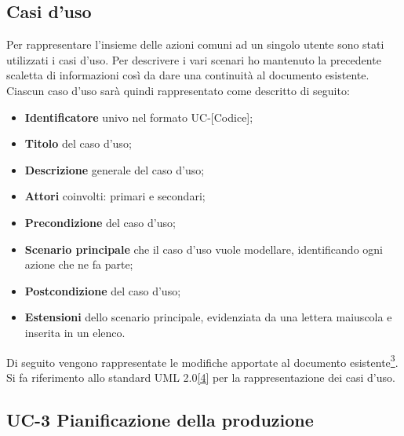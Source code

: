 
\subsection{Casi d'uso}

Per rappresentare l'insieme delle azioni comuni ad un singolo utente sono stati utilizzati i casi d'uso.
Per descrivere i vari scenari ho mantenuto la precedente scaletta di informazioni così da dare una continuità al documento esistente. 
Ciascun caso d'uso sarà quindi rappresentato come descritto di seguito:
\begin{itemize}
    \item \textbf{Identificatore} univo nel formato UC-[Codice];
    \item \textbf{Titolo} del caso d'uso;
    \item \textbf{Descrizione} generale del caso d'uso;
    \item \textbf{Attori} coinvolti: primari e secondari;
    \item \textbf{Precondizione} del caso d'uso;
    \item \textbf{Scenario principale} che il caso d'uso vuole modellare, identificando ogni azione che ne fa parte;
    \item \textbf{Postcondizione} del caso d'uso;
    \item \textbf{Estensioni} dello scenario principale, evidenziata da una lettera maiuscola e inserita in un elenco.
\end{itemize}

Di seguito vengono rappresentate le modifiche apportate al documento esistente\hyperref[analisi-requisiti]{\textsuperscript{3}}.
Si fa riferimento allo standard UML 2.0\hyperref[uml]{[4]} per la rappresentazione dei casi d'uso.

\subsection*{UC-3 Pianificazione della produzione}

